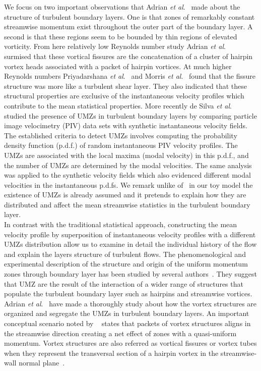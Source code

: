 \documentclass[aps,reprint,amsmath,amssymb,pra]{revtex4-1}%
\begin{document}
We focus on two important observations that Adrian \textit{et al}.~\cite{mca1995} made about the structure of turbulent boundary layers. One is that zones of remarkably constant streamwise momentum exist throughout the outer part of the boundary layer. A second is that these regions seem to be bounded by thin regions of elevated vorticity. From here relatively low Reynolds number study Adrian \textit{et al}.~\cite{amt2000} surmised that these vortical fissures are the concatenation of a cluster of hairpin vortex heads associated with a packet of hairpin vortices. At much higher Reynolds numbers Priyadarshana \textit{et al}.~\cite{priya2007} and Morris \textit{et al}.~\cite{morris2007} found that the fissure structure was more like a turbulent shear layer. They also indicated that these structural properties are exclusive of the instantaneous velocity profiles which contribute to the mean statistical properties. More recently de Silva \textit{et al}.~\cite{umz2015} studied the presence of UMZs in turbulent boundary layers by comparing particle image velocimetry (PIV) data sets with synthetic instantaneous velocity fields. The established criteria to detect UMZs involves computing the probability density function (p.d.f.) of random instantaneous PIV velocity profiles. The UMZs are associated with the local maxima (modal velocity) in this p.d.f., and the number of UMZs are determined by the modal velocities. The same analysis was applied to the synthetic velocity fields which also evidenced different modal velocities in the instantaneous p.d.fs. We remark unlike of~\cite{umz2015} in our toy model the existence of UMZs is already assumed and it pretends to explain how they are distributed and affect the mean streamwise statistics in the turbulent boundary layer. \\
In contrast with the traditional statistical approach, constructing the mean velocity profile by superposition of instantaneous velocity profiles with a different UMZs distribution allow us to examine in detail the individual history of the flow and explain the layers structure of turbulent flows.
The phenomenological and experimental description of the structure and origin of the uniform momentum zones through boundary layer has been studied by several authors~\citep{mca1995,amt2000,umz2015}. They suggest that UMZ are the result of the interaction of a wider range of structures that populate the turbulent boundary layer\cite{amt2000} such as hairpins and streamwise vortices. Adrian \textit{et al}.~\cite{amt2000} have made a thoroughly  study about how the vortex structures are organized and segregate the UMZs in turbulent boundary layers. An important conceptual scenario noted by ~\cite{amt2000} states that packets of vortex structures aligns in the streamwise direction creating a net effect of zones with a quasi-uniform momentum. Vortex structures are also referred as vortical fissures or vortex tubes when they represent the transversal section of a hairpin vortex in the streamwise-wall normal plane~\cite{amt2000}.  
\end{document}
